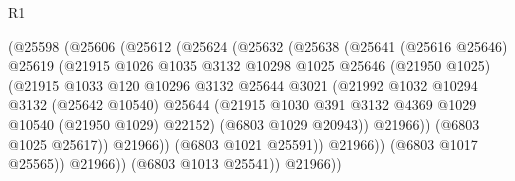 \begin{lexlean}{R1}
\begin{coremodule}
                              (@25598
                                (@25606
                                  (@25612
                                    (@25624
                                      (@25632
                                        (@25638
                                          (@25641
                                            (@25616 @25646)
                                            @25619
                                            (@21915
                                              @1026
                                              @1035
                                              @3132
                                              @10298
                                              @1025
                                              @25646
                                              (@21950 @1025)
                                              (@21915
                                                @1033
                                                @120
                                                @10296
                                                @3132
                                                @25644
                                                @3021
                                                (@21992
                                                  @1032
                                                  @10294
                                                  @3132
                                                  (@25642 @10540)
                                                  @25644
                                                  (@21915
                                                    @1030
                                                    @391
                                                    @3132
                                                    @4369
                                                    @1029
                                                    @10540
                                                    (@21950 @1029)
                                                    @22152)
                                                  (@6803 @1029 @20943))
                                                @21966))
                                            (@6803 @1025 @25617))
                                          @21966))
                                      (@6803 @1021 @25591))
                                    @21966))
                                (@6803 @1017 @25565))
                              @21966))
                          (@6803 @1013 @25541))
                        @21966))

\end{coremodule}
\end{lexlean}

